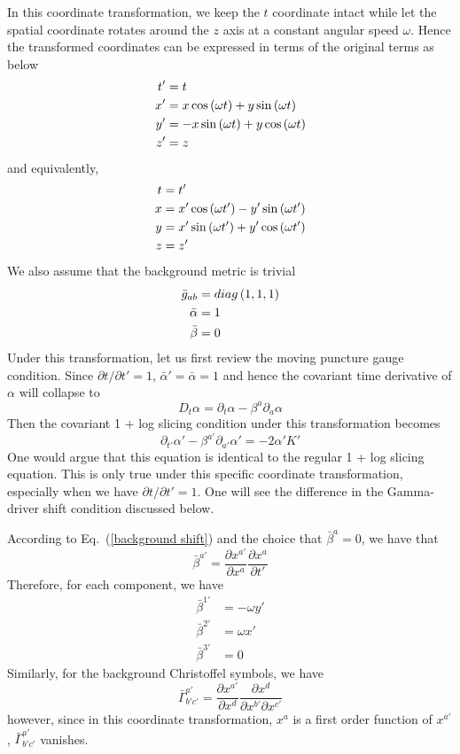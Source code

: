 In this coordinate transformation, we keep the $t$ coordinate intact while let the spatial coordinate rotates around the $z$ axis at a constant angular speed $\omega$. Hence the transformed coordinates can be expressed in terms of the original terms as below
\begin{align}
t' & = t\notag\\
x' & = x \cos\left(\omega t\right) + y\sin\left(\omega t\right)\notag\\
y' & = -x\sin\left(\omega t\right) + y\cos\left(\omega t\right)\notag\\
z' & = z
\end{align}
and equivalently, 
\begin{align}
t & = t'\notag\\
x & = x'\cos\left(\omega t'\right) - y'\sin\left(\omega t'\right)\notag\\
y & = x'\sin\left(\omega t'\right) + y'\cos\left(\omega t'\right)\notag\\
z & = z'
\end{align}
We also assume that the background metric is trivial
\begin{align}
{\bar g}_{ab} & = diag\left(1,1,1\right)\notag\\
{\bar \alpha} & = 1\notag\\
{\bar \beta} & = 0 
\end{align}
Under this transformation, let us first review the moving puncture gauge condition. Since $\partial t/\partial t' = 1$, ${\bar \alpha}' = {\bar \alpha} = 1$ and hence the covariant time derivative of $\alpha$ will collapse to
\begin{equation}
D_{t}\alpha = \partial_{t}\alpha - \beta^{a}\partial_{a}\alpha
\end{equation}
Then the covariant 1 + log slicing condition under this transformation becomes
\begin{equation}\label{transformed 1 + log slicing}
\partial_{t'}\alpha' - \beta^{a'}\partial_{a'}\alpha' = -2\alpha'K'
\end{equation}
One would argue that this equation is identical to the regular 1 + log slicing equation. This is only true under this specific coordinate transformation, especially when we have $\partial t/\partial t' = 1$. One will see the difference in the Gamma-driver shift condition discussed below. 

According to Eq.~(\ref{background shift}) and the choice that ${\bar \beta}^{a} = 0$, we have that
\[
{\bar \beta}^{a'} = \frac{\partial x^{a'}}{\partial x^{a}}\frac{\partial x^{a}}{\partial t'}
\]
Therefore, for each component, we have
\begin{align*}
{\bar \beta}^{1'} & = -\omega y'\\
{\bar \beta}^{2'} & = \omega x'\\
{\bar \beta}^{3'} & = 0
\end{align*}
Similarly, for the background Christoffel symbols, we have
\[
{\bar \Gamma}^{a'}_{b'c'} = \frac{\partial x^{a'}}{\partial x^{d}}\frac{\partial x^{d}}{\partial x^{b'}\partial x^{c'}}
\]
however, since in this coordinate transformation, $x^{a}$ is a first order function of $x^{a'}$, ${\bar \Gamma}^{a'}_{b'c'}$ vanishes. 

